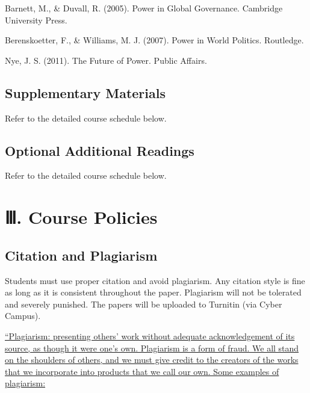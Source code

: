 \documentclass[
  letterpaper,
  DIV=11,
  numbers=noendperiod]{scrartcl}
\begin{document}
Barnett, M., \& Duvall, R. (2005). Power in Global Governance. Cambridge
University Press.

Berenskoetter, F., \& Williams, M. J. (2007). Power in World Politics.
Routledge.

Nye, J. S. (2011). The Future of Power. Public Affairs.

\hypertarget{supplementary-materials}{%
\subsection{Supplementary Materials}\label{supplementary-materials}}

Refer to the detailed course schedule below.

\hypertarget{optional-additional-readings}{%
\subsection{Optional Additional
Readings}\label{optional-additional-readings}}

Refer to the detailed course schedule below.

\hypertarget{course-policies}{%
\section{\texorpdfstring{{\textbf{Ⅲ. Course
Policies}}}{Ⅲ. Course Policies}}\label{course-policies}}

\hypertarget{citation-and-plagiarism}{%
\subsection{Citation and Plagiarism}\label{citation-and-plagiarism}}

Students must use proper citation and avoid plagiarism. Any citation
style is fine as long as it is consistent throughout the paper.
Plagiarism will not be tolerated and severely punished. The papers will
be uploaded to Turnitin (via Cyber Campus).

\href{(https://www.nyu.edu/about/policies-guidelines-compliance/policies-and-guidelines/academic-integrity-for-students-at-nyu.html)}{``Plagiarism:
presenting others' work without adequate acknowledgement of its source,
as though it were one's own. Plagiarism is a form of fraud. We all stand
on the shoulders of others, and we must give credit to the creators of
the works that we incorporate into products that we call our own. Some
examples of plagiarism:}
\end{document}
